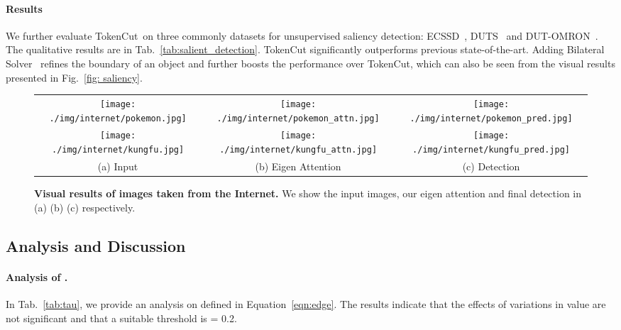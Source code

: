 \documentclass[twocolumn]{article}
\newcommand{\name} {TokenCut}
\begin{document}
\paragraph{Results}
We further evaluate \name~on three commonly datasets for unsupervised saliency detection: ECSSD~\cite{shi2015hierarchical}, DUTS~\cite{wang2017learning} and DUT-OMRON~\cite{yang2013saliency}. The qualitative results are in Tab.~\ref{tab:salient_detection}. TokenCut significantly outperforms previous state-of-the-art. Adding Bilateral Solver~\cite{barron2016fast} refines the boundary of an object and further boosts the performance over TokenCut, which can also be seen from the visual results presented in Fig.~\ref{fig: saliency}. 

\begin{figure}[!t]

\centering
\begin{tabular}{c@{\hskip 3pt}c@{\hskip 3pt}c}

        \texttt{[image: ./img/internet/pokemon.jpg]} &
        \texttt{[image: ./img/internet/pokemon\_attn.jpg]}&
        \texttt{[image: ./img/internet/pokemon\_pred.jpg]} \\	
		
        \texttt{[image: ./img/internet/kungfu.jpg]} &
        \texttt{[image: ./img/internet/kungfu\_attn.jpg]}&
        \texttt{[image: ./img/internet/kungfu\_pred.jpg]} \\
        (a) Input & (b) Eigen Attention & (c) Detection \\ 
\end{tabular}

\caption{\textbf{Visual results of images taken from the Internet.} We show the input images, our eigen attention and final detection in (a) (b) (c) respectively.}
\label{fig:extra_samples}

\end{figure}



\subsection{Analysis and Discussion}
\label{sec:abl}

\paragraph{Analysis of .} In Tab.~\ref{tab:tau}, we provide an analysis on  defined in Equation~\ref{eqn:edge}. The results indicate that the effects of variations in  value are not significant and that a suitable threshold is  = 0.2. 
\end{document}
